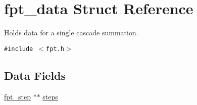 \hypertarget{structfpt__data}{
\section{fpt\_\-data Struct Reference}
\label{structfpt__data}
}
Holds data for a single cascade summation.  


{\tt \#include $<$fpt.h$>$}

\subsection*{Data Fields}
\begin{CompactItemize}
\item 
\hypertarget{structfpt__data_97bccf61367adec92d3fd83abd7a43d2}{
\hyperlink{structfpt__step}{fpt\_\-step} $\ast$$\ast$ \hyperlink{structfpt__data_97bccf61367adec92d3fd83abd7a43d2}{steps}}
\label{structfpt__data_97bccf61367adec92d3fd83abd7a43d2}


\end{CompactItemize}
